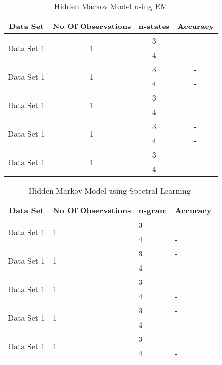 \documentclass{article} %
\begin{document}
\begin{table}[t]
\caption{Hidden Markov Model using EM}
\label{HMM_EM}
\begin{center}
\begin{tabular}{ |c|c|c|c| }
\hline
\multicolumn{1}{|c|}{\bf Data Set} &\multicolumn{1}{|c|}{\bf No Of Observations} &\multicolumn{1}{|c|}{\bf n-states} &\multicolumn{1}{|c|}{\bf Accuracy}\\
\hline
\multirow{2}{*}{Data Set 1}& \multirow{2}{*}{1} & 3 & - \\
& & 4 & - \\
\hline
\multirow{2}{*}{Data Set 1}& \multirow{2}{*}{1} & 3 & - \\
& & 4 & - \\
\hline
\multirow{2}{*}{Data Set 1}& \multirow{2}{*}{1} & 3 & - \\
& & 4 & - \\
\hline
\multirow{2}{*}{Data Set 1}& \multirow{2}{*}{1} & 3 & - \\
& & 4 & - \\
\hline
\multirow{2}{*}{Data Set 1}& \multirow{2}{*}{1} & 3 & - \\
& & 4 & - \\
\hline
\end{tabular}
\end{center}
\end{table}

\begin{table}[t]
\caption{Hidden Markov Model using Spectral Learning}
\label{Spectral Learning}
\begin{center}
\begin{tabular}{ |l|l|l|l| }
\hline
\multicolumn{1}{|c|}{\bf Data Set} &\multicolumn{1}{|c|}{\bf No Of Observations} &\multicolumn{1}{|c|}{\bf n-gram} &\multicolumn{1}{|c|}{\bf Accuracy}\\
\hline
\multirow{2}{*}{Data Set 1}& \multirow{2}{*}{1} & 3 & - \\
& & 4 & - \\
\hline
\multirow{2}{*}{Data Set 1}& \multirow{2}{*}{1} & 3 & - \\
& & 4 & - \\
\hline
\multirow{2}{*}{Data Set 1}& \multirow{2}{*}{1} & 3 & - \\
& & 4 & - \\
\hline
\multirow{2}{*}{Data Set 1}& \multirow{2}{*}{1} & 3 & - \\
& & 4 & - \\
\hline
\multirow{2}{*}{Data Set 1}& \multirow{2}{*}{1} & 3 & - \\
& & 4 & - \\
\hline
\end{tabular}
\end{center}
\end{table}
\end{document}
